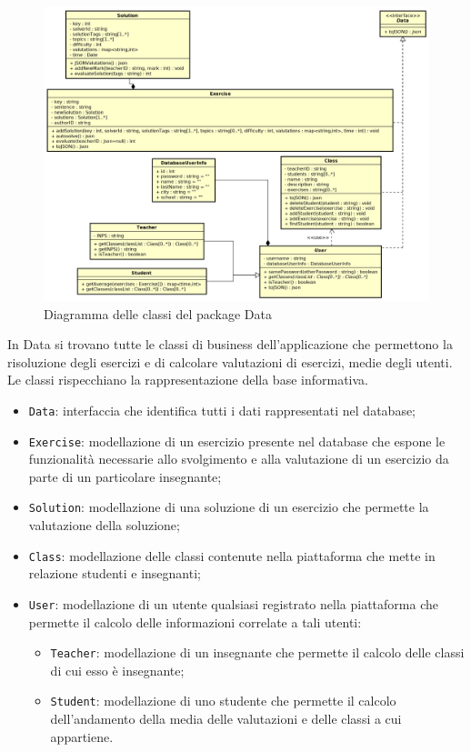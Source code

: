 \begin{figure}[ht]
	\includegraphics[scale=0.45]{images/Data.png}
	\caption{Diagramma delle classi del package Data}
\end{figure}

In Data si trovano tutte le classi di business dell'applicazione che permettono la risoluzione degli esercizi e di calcolare valutazioni di esercizi, medie degli utenti. Le classi rispecchiano la rappresentazione della base informativa.

\begin{itemize}
	\item \texttt{Data}: interfaccia che identifica tutti i dati rappresentati nel database;
	\item \texttt{Exercise}: modellazione di un esercizio presente nel database che espone le funzionalità necessarie allo svolgimento e alla valutazione di un esercizio da parte di un particolare insegnante;
	\item	\texttt{Solution}: modellazione di una soluzione di un esercizio che permette la valutazione della soluzione;
	\item \texttt{Class}: modellazione delle classi contenute nella piattaforma che mette in relazione studenti e insegnanti;
	\item \texttt{User}: modellazione di un utente qualsiasi registrato nella piattaforma che permette il calcolo delle informazioni correlate a tali utenti:
	\begin{itemize}
		\item \texttt{Teacher}: modellazione di un insegnante che permette il calcolo delle classi di cui esso è insegnante;
		\item \texttt{Student}: modellazione di uno studente che permette il calcolo dell'andamento della media delle valutazioni e delle classi a cui appartiene.
	\end{itemize}
\end{itemize}

